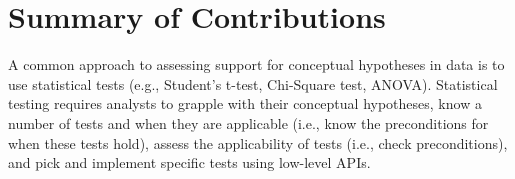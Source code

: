 \begin{comment}
First, recent development has focused on updating the outputs of Tea to include
(i) interactive visualizations and (ii) text for reporting the statistical
results in the American Psychological Association's recommended formats for each
valid statistical test. The interactive visualizations aim to illustrate what
the results of the statistical tests mean, such as scatterplots for correlations
and heatmaps for the Chi-squared test. We selected the visualizations for each
test based on recommendations from Franconeri et
al.~\cite{franconeriVisualizationChooser}, what existing tools such as
JMP~\cite{jmp} already use, and our own experiences using and trying to
communicate statistical results. Development and initial user testing is on
track to wrap up by the end of spring quarter. 

Second, a usability issue with Tea's current API is its reliance of ``magic
strings.'' We are currently refactoring the API to be more object-oriented by
extending Tisane's variables data classes. We hope this revision will be more
usable with ``free'' help from existing IDEs such as VSCode that provide API
suggestions inline when specifying parameters. 

Both features will be incorporated into a new release of Tea, which I have
currently scheduled for June, 2022. 
\end{comment}

\section{Summary of Contributions} \label{sec:summaryTea}


A common approach to assessing support for conceptual hypotheses in data is to
use statistical tests (e.g., Student's t-test, Chi-Square test, ANOVA).
Statistical testing requires analysts to grapple with their conceptual
hypotheses, know a number of tests and when they are applicable (i.e., know the
preconditions for when these tests hold), assess the applicability of tests
(i.e., check preconditions), and pick and implement specific tests using
low-level APIs. 

